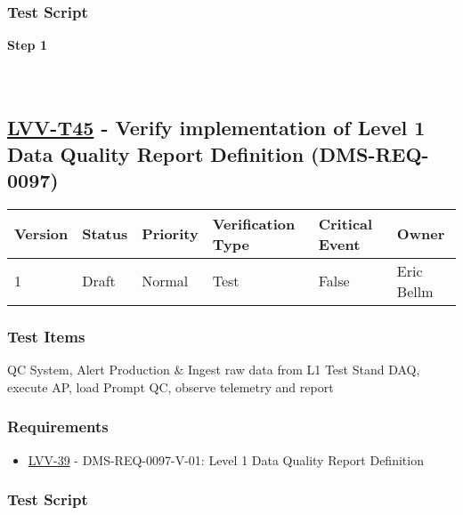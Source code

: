\hypertarget{test-script-21}{%
\subsubsection{Test Script}\label{test-script-21}}

\textbf{Step 1}\\
~\\
~\\

\hypertarget{lvv-t45---verify-implementation-of-level-1-data-quality-report-definition-dms-req-0097}{%
\subsection{\texorpdfstring{\href{https://jira.lsstcorp.org/secure/Tests.jspa\#/testCase/LVV-T45}{LVV-T45}
- Verify implementation of Level 1 Data Quality Report Definition
(DMS-REQ-0097)}{LVV-T45 - Verify implementation of Level 1 Data Quality Report Definition (DMS-REQ-0097)}}\label{lvv-t45---verify-implementation-of-level-1-data-quality-report-definition-dms-req-0097}}

\begin{longtable}[]{@{}llllll@{}}
\toprule
Version & Status & Priority & Verification Type & Critical Event &
Owner\tabularnewline
\midrule
\endhead
1 & Draft & Normal & Test & False & Eric Bellm\tabularnewline
\bottomrule
\end{longtable}

\hypertarget{test-items-21}{%
\subsubsection{Test Items}\label{test-items-21}}

QC System, Alert Production \& Ingest raw data from L1 Test Stand DAQ,
execute AP, load Prompt QC, observe telemetry and report

\hypertarget{requirements-22}{%
\subsubsection{Requirements}\label{requirements-22}}

\begin{itemize}
\tightlist
\item
  \href{https://jira.lsstcorp.org/browse/LVV-39}{LVV-39} -
  DMS-REQ-0097-V-01: Level 1 Data Quality Report Definition
\end{itemize}

\hypertarget{test-script-22}{%
\subsubsection{Test Script}\label{test-script-22}}

